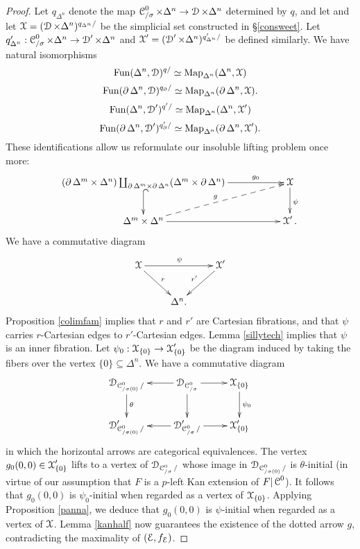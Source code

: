 \begin{proof}
Let $q_{\Delta^n}$ denote the map $\operatorname{\mathcal{C}}^0_{/\sigma} \times \Delta^n \rightarrow
\operatorname{\mathcal{D}} \times \Delta^n$ determined by $q$, and let
and let $\operatorname{\mathcal{X}} = (\operatorname{\mathcal{D}} \times \Delta^n)^{q_{\Delta^n}/}$ be the simplicial set constructed in \S \ref{consweet}. Let $q'_{\Delta^n}: \operatorname{\mathcal{C}}^{0}_{/\sigma} \times \Delta^n \rightarrow
\operatorname{\mathcal{D}}' \times \Delta^n$ and $\operatorname{\mathcal{X}}' = ( \operatorname{\mathcal{D}}' \times \Delta^n)^{q'_{\Delta^n}/}$
be defined similarly. We have natural isomorphisms
$$ \operatorname{Fun}(\Delta^n,\operatorname{\mathcal{D}})^{q/} \simeq \operatorname{{Map}}_{\Delta^n}(\Delta^n, \operatorname{\mathcal{X}})$$
$$ \operatorname{Fun}(\operatorname{\partial} \Delta^n, \operatorname{\mathcal{D}})^{q_{\operatorname{\partial}}/} \simeq \operatorname{{Map}}_{\Delta^n}( \operatorname{\partial} \Delta^n, \operatorname{\mathcal{X}}).$$
$$ \operatorname{Fun}(\Delta^n,\operatorname{\mathcal{D}}')^{q'/} \simeq \operatorname{{Map}}_{\Delta^n}(\Delta^n, \operatorname{\mathcal{X}}')$$
$$ \operatorname{Fun}(\operatorname{\partial} \Delta^n, \operatorname{\mathcal{D}}')^{q'_{\operatorname{\partial}}/} \simeq \operatorname{{Map}}_{\Delta^n}( \operatorname{\partial} \Delta^n, \operatorname{\mathcal{X}}').$$
These identifications allow us reformulate our insoluble lifting problem once more:
$$ \xymatrix{ ( \bd \Delta^m \times \Delta^n ) \coprod_{ \bd \Delta^m \times \bd \Delta^n }
( \Delta^m \times \bd \Delta^n) \ar[rr]^-{g_0} \ar@{^{(}->}[d] & & \calX \ar[d]^{\psi} \\
\Delta^m \times \Delta^n \ar@{-->}[urr]^{g} \ar[rr] & & \calX'. }$$
We have a commutative diagram
$$ \xymatrix{ \calX \ar[rr]^{\psi} \ar[dr]^{r} & & \calX' \ar[dl]_{r'} \\
& \Delta^n. & }$$
Proposition \ref{colimfam} implies that $r$ and $r'$ are 
Cartesian fibrations, and that $\psi$ carries $r$-Cartesian edges
to $r'$-Cartesian edges. Lemma \ref{sillytech} implies that $\psi$ is an inner fibration.
Let $\psi_0: \operatorname{\mathcal{X}}_{ \{0\} } \rightarrow \operatorname{\mathcal{X}}'_{ \{0\} }$ be the diagram induced by taking
the fibers over the vertex $\{0\} \subseteq \Delta^n$. We have a commutative diagram
$$ \xymatrix{ \calD_{ \calC^{0}_{/\sigma(0)}/ } \ar[d]^{\theta} & \calD_{ \calC^{0}_{/\sigma} }\ar[l] \ar[d] \ar[r] &
\calX_{ \{0\} } \ar[d]^{\psi_0} \\
\calD'_{ \calC^{0}_{/ \sigma(0)}/} & \calD'_{ \calC^{0}_{/\sigma}/} \ar[r] \ar[l] & \calX'_{ \{0\} }}$$
in which the horizontal arrows are categorical equivalences. The vertex
$g_0(0,0) \in \operatorname{\mathcal{X}}'_{ \{0\} }$ lifts to a vertex of 
$\operatorname{\mathcal{D}}_{ \operatorname{\mathcal{C}}^{0}_{/\sigma}/}$ whose image in $\operatorname{\mathcal{D}}_{ \operatorname{\mathcal{C}}^{0}_{/\sigma(0)}/ }$
is $\theta$-initial (in virtue of our assumption that $F$ is a $p$-left Kan extension
of $F| \operatorname{\mathcal{C}}^{0}$). It follows that $g_0(0,0)$ is $\psi_0$-initial when regarded as a vertex of $\operatorname{\mathcal{X}}_{ \{0\} }$. 
Applying Proposition \ref{panna}, we deduce
that $g_0(0,0)$ is $\psi$-initial when regarded as a vertex of $\operatorname{\mathcal{X}}$. 
Lemma \ref{kanhalf} now guarantees the existence of the dotted arrow $g$, contradicting the maximality of $(\operatorname{\mathcal{E}}, f_{\operatorname{\mathcal{E}}})$.
\end{proof}

